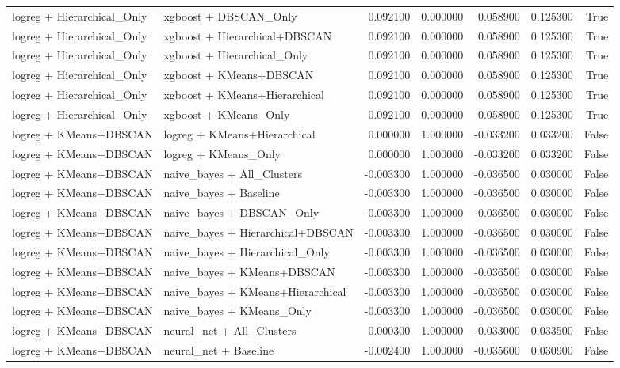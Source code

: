 \begin{tabular}{llrrrrr}
logreg + Hierarchical_Only & xgboost + DBSCAN_Only & 0.092100 & 0.000000 & 0.058900 & 0.125300 & True \\
logreg + Hierarchical_Only & xgboost + Hierarchical+DBSCAN & 0.092100 & 0.000000 & 0.058900 & 0.125300 & True \\
logreg + Hierarchical_Only & xgboost + Hierarchical_Only & 0.092100 & 0.000000 & 0.058900 & 0.125300 & True \\
logreg + Hierarchical_Only & xgboost + KMeans+DBSCAN & 0.092100 & 0.000000 & 0.058900 & 0.125300 & True \\
logreg + Hierarchical_Only & xgboost + KMeans+Hierarchical & 0.092100 & 0.000000 & 0.058900 & 0.125300 & True \\
logreg + Hierarchical_Only & xgboost + KMeans_Only & 0.092100 & 0.000000 & 0.058900 & 0.125300 & True \\
logreg + KMeans+DBSCAN & logreg + KMeans+Hierarchical & 0.000000 & 1.000000 & -0.033200 & 0.033200 & False \\
logreg + KMeans+DBSCAN & logreg + KMeans_Only & 0.000000 & 1.000000 & -0.033200 & 0.033200 & False \\
logreg + KMeans+DBSCAN & naive_bayes + All_Clusters & -0.003300 & 1.000000 & -0.036500 & 0.030000 & False \\
logreg + KMeans+DBSCAN & naive_bayes + Baseline & -0.003300 & 1.000000 & -0.036500 & 0.030000 & False \\
logreg + KMeans+DBSCAN & naive_bayes + DBSCAN_Only & -0.003300 & 1.000000 & -0.036500 & 0.030000 & False \\
logreg + KMeans+DBSCAN & naive_bayes + Hierarchical+DBSCAN & -0.003300 & 1.000000 & -0.036500 & 0.030000 & False \\
logreg + KMeans+DBSCAN & naive_bayes + Hierarchical_Only & -0.003300 & 1.000000 & -0.036500 & 0.030000 & False \\
logreg + KMeans+DBSCAN & naive_bayes + KMeans+DBSCAN & -0.003300 & 1.000000 & -0.036500 & 0.030000 & False \\
logreg + KMeans+DBSCAN & naive_bayes + KMeans+Hierarchical & -0.003300 & 1.000000 & -0.036500 & 0.030000 & False \\
logreg + KMeans+DBSCAN & naive_bayes + KMeans_Only & -0.003300 & 1.000000 & -0.036500 & 0.030000 & False \\
logreg + KMeans+DBSCAN & neural_net + All_Clusters & 0.000300 & 1.000000 & -0.033000 & 0.033500 & False \\
logreg + KMeans+DBSCAN & neural_net + Baseline & -0.002400 & 1.000000 & -0.035600 & 0.030900 & False \\

\end{tabular}
